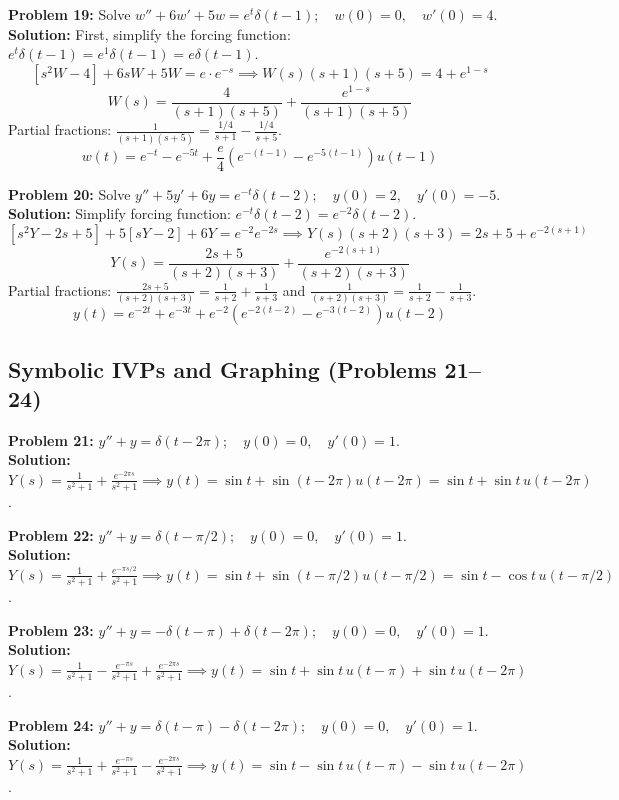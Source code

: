 \documentclass[11pt, letterpaper]{article}
\theoremstyle{definition}
\theoremstyle{remark}
\begin{document}
\textbf{Problem 19:} Solve $w'' + 6w' + 5w = e^t\delta(t - 1); \quad w(0) = 0, \quad w'(0) = 4$.
\\[4pt]
\textbf{Solution:} First, simplify the forcing function: $e^t\delta(t-1) = e^1\delta(t-1) = e\delta(t-1)$.
\[ [s^2 W - 4] + 6sW + 5W = e \cdot e^{-s} \implies W(s)(s+1)(s+5) = 4 + e^{1-s} \]
\[ W(s) = \frac{4}{(s+1)(s+5)} + \frac{e^{1-s}}{(s+1)(s+5)} \]
Partial fractions: $\frac{1}{(s+1)(s+5)} = \frac{1/4}{s+1} - \frac{1/4}{s+5}$.
\[ w(t) = e^{-t} - e^{-5t} + \frac{e}{4}\left(e^{-(t-1)} - e^{-5(t-1)}\right)u(t-1) \]

\textbf{Problem 20:} Solve $y'' + 5y' + 6y = e^{-t}\delta(t - 2); \quad y(0) = 2, \quad y'(0) = -5$.
\\[4pt]
\textbf{Solution:} Simplify forcing function: $e^{-t}\delta(t-2) = e^{-2}\delta(t-2)$.
\[ [s^2 Y - 2s + 5] + 5[sY - 2] + 6Y = e^{-2}e^{-2s} \implies Y(s)(s+2)(s+3) = 2s + 5 + e^{-2(s+1)} \]
\[ Y(s) = \frac{2s + 5}{(s+2)(s+3)} + \frac{e^{-2(s+1)}}{(s+2)(s+3)} \]
Partial fractions: $\frac{2s+5}{(s+2)(s+3)} = \frac{1}{s+2} + \frac{1}{s+3}$ and $\frac{1}{(s+2)(s+3)} = \frac{1}{s+2} - \frac{1}{s+3}$.
\[ y(t) = e^{-2t} + e^{-3t} + e^{-2}\left(e^{-2(t-2)} - e^{-3(t-2)}\right)u(t-2) \]

\subsection{Symbolic IVPs and Graphing (Problems 21--24)}

\textbf{Problem 21:} $y'' + y = \delta(t - 2\pi); \quad y(0) = 0, \quad y'(0) = 1$.
\\[4pt]
\textbf{Solution:} $Y(s) = \frac{1}{s^2+1} + \frac{e^{-2\pi s}}{s^2+1} \implies y(t) = \sin t + \sin(t-2\pi)u(t-2\pi) = \sin t + \sin t \, u(t-2\pi)$.

\textbf{Problem 22:} $y'' + y = \delta(t - \pi/2); \quad y(0) = 0, \quad y'(0) = 1$.
\\[4pt]
\textbf{Solution:} $Y(s) = \frac{1}{s^2+1} + \frac{e^{-\pi s/2}}{s^2+1} \implies y(t) = \sin t + \sin(t-\pi/2)u(t-\pi/2) = \sin t - \cos t \, u(t-\pi/2)$.

\textbf{Problem 23:} $y'' + y = -\delta(t - \pi) + \delta(t - 2\pi); \quad y(0) = 0, \quad y'(0) = 1$.
\\[4pt]
\textbf{Solution:} $Y(s) = \frac{1}{s^2+1} - \frac{e^{-\pi s}}{s^2+1} + \frac{e^{-2\pi s}}{s^2+1} \implies y(t) = \sin t + \sin t \, u(t-\pi) + \sin t \, u(t-2\pi)$.

\textbf{Problem 24:} $y'' + y = \delta(t - \pi) - \delta(t - 2\pi); \quad y(0) = 0, \quad y'(0) = 1$.
\\[4pt]
\textbf{Solution:} $Y(s) = \frac{1}{s^2+1} + \frac{e^{-\pi s}}{s^2+1} - \frac{e^{-2\pi s}}{s^2+1} \implies y(t) = \sin t - \sin t \, u(t-\pi) - \sin t \, u(t-2\pi)$.
\end{document}
